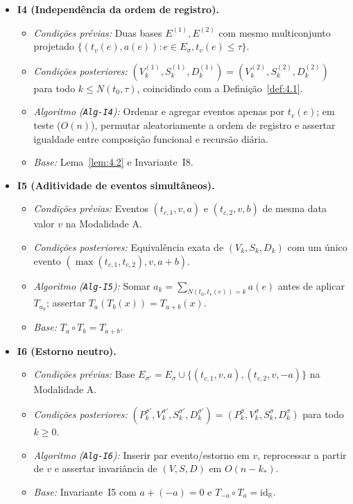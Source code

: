 \documentclass[11pt, a4paper]{article}
\theoremstyle{definition}
\theoremstyle{plain}
\theoremstyle{remark}
\begin{document}
\begin{itemize}
    \item \textbf{I4 (Independência da ordem de registro).}
    \begin{itemize}
        \item \emph{Condições prévias:} Duas bases $E^{(1)}, E^{(2)}$ com mesmo multiconjunto projetado $\{(t_v(e), a(e)) : e \in E_\sigma, t_v(e) \le \tau\}$.
        \item \emph{Condições posteriores:} $(V_k^{(1)}, S_k^{(1)}, D_k^{(1)}) = (V_k^{(2)}, S_k^{(2)}, D_k^{(2)})$ para todo $k \le N(t_0, \tau)$, coincidindo com a Definição~\ref{def:4.1}.
        \item \emph{Algoritmo (\texttt{Alg-I4}):} Ordenar e agregar eventos apenas por $t_v(e)$; em teste ($O(n)$), permutar aleatoriamente a ordem de registro e assertar igualdade entre composição funcional e recursão diária.
        \item \emph{Base:} Lema~\ref{lem:4.2} e Invariante~I8.
    \end{itemize}

    \item \textbf{I5 (Aditividade de eventos simultâneos).}
    \begin{itemize}
        \item \emph{Condições prévias:} Eventos $(t_{c,1}, v, a)$ e $(t_{c,2}, v, b)$ de mesma data valor $v$ na Modalidade A.
        \item \emph{Condições posteriores:} Equivalência exata de $(V_k, S_k, D_k)$ com um único evento $(\max(t_{c,1}, t_{c,2}), v, a + b)$.
        \item \emph{Algoritmo (\texttt{Alg-I5}):} Somar $a_k = \sum_{N(t_0, t_v(e))=k} a(e)$ antes de aplicar $T_{a_k}$; assertar $T_a(T_b(x)) = T_{a+b}(x)$.
        \item \emph{Base:} $T_a \circ T_b = T_{a+b}$.
    \end{itemize}

    \item \textbf{I6 (Estorno neutro).}
    \begin{itemize}
        \item \emph{Condições prévias:} Base $E_{\sigma'} = E_\sigma \cup \{(t_{c,1}, v, a), (t_{c,2}, v, -a)\}$ na Modalidade A.
        \item \emph{Condições posteriores:} $(P_k^{\sigma'}, V_k^{\sigma'}, S_k^{\sigma'}, D_k^{\sigma'}) = (P_k^\sigma, V_k^\sigma, S_k^\sigma, D_k^\sigma)$ para todo $k \ge 0$.
        \item \emph{Algoritmo (\texttt{Alg-I6}):} Inserir par evento/estorno em $v$, reprocessar a partir de $v$ e assertar invariância de $(V, S, D)$ em $O(n - k_*)$.
        \item \emph{Base:} Invariante~I5 com $a + (-a) = 0$ e $T_{-a} \circ T_a = \mathrm{id}_{\mathbb{R}}$.
    \end{itemize}
\end{itemize}
\end{document}
